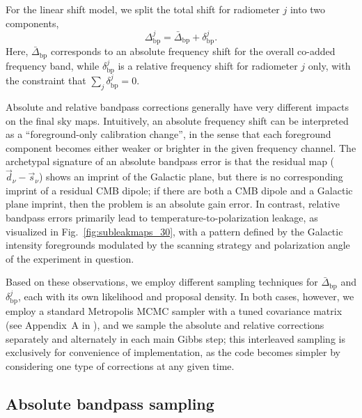 \documentclass[twocolumn]{aa}
\renewcommand{\d}[0]{\vec{d}}
\newcommand{\s}[0]{\vec{s}}
\newcommand{\?}[1]{\textcolor{red}{{\bf [#1]}}}
\begin{document}
For the linear shift model, we split the total shift for radiometer
$j$ into two components,
\begin{equation} 
  \Delta_{\mathrm{bp}}^j = \bar{\Delta}_{\mathrm{bp}} + \delta_{\mathrm{bp}}^j.
  \label{eq:correction}
\end{equation}
Here, $\bar{\Delta}_{\mathrm{bp}}$ corresponds to an absolute
frequency shift for the overall co-added frequency band, while
$\delta_{\mathrm{bp}}^j$ is a relative frequency shift for radiometer
$j$ only, with the constraint that $\sum_j\delta_{\mathrm{bp}}^j = 0$.

Absolute and relative bandpass corrections generally have very
different impacts on the final sky maps. Intuitively, an absolute
frequency shift can be interpreted as a ``foreground-only calibration
change'', in the sense that each foreground component becomes either
weaker or brighter in the given frequency channel. The archetypal
signature of an absolute bandpass error is that the residual map
($\d_{\nu}-\s_{\nu}$) shows an imprint of the Galactic plane, but
there is no corresponding imprint of a residual CMB dipole; if there
are both a CMB dipole and a Galactic plane imprint, then the problem
is an absolute gain error. In contrast, relative bandpass errors
primarily lead to temperature-to-polarization leakage, as visualized
in Fig.~\ref{fig:subleakmaps_30}, with a pattern defined by the
Galactic intensity foregrounds modulated by the scanning strategy and
polarization angle of the experiment in question.

Based on these observations, we employ different sampling techniques for
$\bar{\Delta}_{\mathrm{bp}}$ and $\delta_{\mathrm{bp}}^j$, each with its own
likelihood and proposal density. In both cases, however, we employ a standard
Metropolis MCMC sampler with a tuned covariance matrix (see Appendix~A in
\citealp{bp01}), and we sample the absolute and relative corrections separately
and alternately in each main Gibbs step; this interleaved sampling is
exclusively for convenience of implementation, as the code becomes simpler by
considering one type of corrections at any given time.


\subsection{Absolute bandpass sampling}
\end{document}
